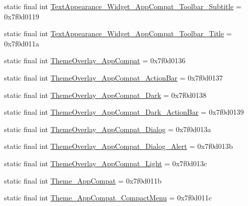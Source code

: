 \begin{DoxyCompactItemize}
static final int \mbox{\hyperlink{classandroid_1_1support_1_1v7_1_1appcompat_1_1R_1_1style_ac0dfcde296d98d6934a405e562bcb03a}{Text\+Appearance\+\_\+\+Widget\+\_\+\+App\+Compat\+\_\+\+Toolbar\+\_\+\+Subtitle}} = 0x7f0d0119
\item 
static final int \mbox{\hyperlink{classandroid_1_1support_1_1v7_1_1appcompat_1_1R_1_1style_a28d5448998ba455f9737b0c596c86e4c}{Text\+Appearance\+\_\+\+Widget\+\_\+\+App\+Compat\+\_\+\+Toolbar\+\_\+\+Title}} = 0x7f0d011a
\item 
static final int \mbox{\hyperlink{classandroid_1_1support_1_1v7_1_1appcompat_1_1R_1_1style_a64b85d09de2998a010cefa99b11df028}{Theme\+Overlay\+\_\+\+App\+Compat}} = 0x7f0d0136
\item 
static final int \mbox{\hyperlink{classandroid_1_1support_1_1v7_1_1appcompat_1_1R_1_1style_a082b745b4e2430ec34548fd43dabd3c6}{Theme\+Overlay\+\_\+\+App\+Compat\+\_\+\+Action\+Bar}} = 0x7f0d0137
\item 
static final int \mbox{\hyperlink{classandroid_1_1support_1_1v7_1_1appcompat_1_1R_1_1style_a153bf2a32f53c4a761520ebb9d57ba46}{Theme\+Overlay\+\_\+\+App\+Compat\+\_\+\+Dark}} = 0x7f0d0138
\item 
static final int \mbox{\hyperlink{classandroid_1_1support_1_1v7_1_1appcompat_1_1R_1_1style_a51b51d13caa660cffc430f496874d8dc}{Theme\+Overlay\+\_\+\+App\+Compat\+\_\+\+Dark\+\_\+\+Action\+Bar}} = 0x7f0d0139
\item 
static final int \mbox{\hyperlink{classandroid_1_1support_1_1v7_1_1appcompat_1_1R_1_1style_aef17421b16165eacac83a3c957f994d0}{Theme\+Overlay\+\_\+\+App\+Compat\+\_\+\+Dialog}} = 0x7f0d013a
\item 
static final int \mbox{\hyperlink{classandroid_1_1support_1_1v7_1_1appcompat_1_1R_1_1style_a9cc27c98642ced4bbf8c2324b8c3be33}{Theme\+Overlay\+\_\+\+App\+Compat\+\_\+\+Dialog\+\_\+\+Alert}} = 0x7f0d013b
\item 
static final int \mbox{\hyperlink{classandroid_1_1support_1_1v7_1_1appcompat_1_1R_1_1style_a9aee71f01b9ed4c13fef15dcd60b2316}{Theme\+Overlay\+\_\+\+App\+Compat\+\_\+\+Light}} = 0x7f0d013c
\item 
static final int \mbox{\hyperlink{classandroid_1_1support_1_1v7_1_1appcompat_1_1R_1_1style_a36039e9a627267e186a60d97337bdde1}{Theme\+\_\+\+App\+Compat}} = 0x7f0d011b
\item 
static final int \mbox{\hyperlink{classandroid_1_1support_1_1v7_1_1appcompat_1_1R_1_1style_af47c390e032a3ca9e7d85968a3f4fa18}{Theme\+\_\+\+App\+Compat\+\_\+\+Compact\+Menu}} = 0x7f0d011c

\end{DoxyCompactItemize}
